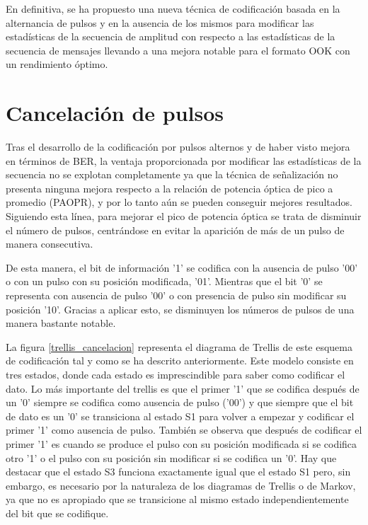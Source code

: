 En definitiva, se ha propuesto una nueva técnica de codificación basada en la 
alternancia de pulsos y en la ausencia de los mismos para modificar las estadísticas de la
secuencia de amplitud con respecto a las estadísticas de la secuencia de mensajes llevando
a una mejora notable para el formato OOK con un rendimiento óptimo.

\section{Cancelación de pulsos}

Tras el desarrollo de la codificación por pulsos alternos y de haber visto mejora en 
términos de BER, la ventaja proporcionada por modificar las estadísticas de la secuencia
no se explotan completamente ya que la técnica de señalización no presenta ninguna mejora
respecto a la relación de potencia óptica de pico a promedio (PAOPR), y por lo tanto aún
se pueden conseguir mejores resultados. Siguiendo esta línea, para mejorar el pico de 
potencia óptica se trata de disminuir el número de pulsos, centrándose en evitar la 
aparición de más de un pulso de manera consecutiva. 

De esta manera, el bit de información '1' se codifica con la ausencia de pulso '00' 
o con un pulso con su posición modificada, '01'. Mientras que el bit '0' se representa con
ausencia de pulso '00' o con presencia de pulso sin modificar su posición '10'. Gracias
a aplicar esto, se disminuyen los números de pulsos de una manera bastante notable. 

La figura \ref{trellis_cancelacion} representa el diagrama de Trellis de este esquema
de codificación tal y como se ha descrito anteriormente. Este modelo consiste en tres 
estados, donde cada estado es imprescindible para saber como codificar el dato.
Lo más importante del trellis es que el primer '1' que se codifica después de un '0'
siempre se codifica como ausencia de pulso ('00') y que siempre que el bit de dato
es un '0' se transiciona al estado S1 para volver a empezar y codificar el primer '1'
como ausencia de pulso. También se observa que después de codificar el primer '1' es 
cuando se produce el pulso con su posición modificada si se codifica otro '1' o el 
pulso con su posición sin modificar si se codifica un '0'.
Hay que destacar que el estado S3 funciona exactamente igual que el estado S1 pero,
sin embargo, es necesario por la naturaleza de los diagramas de Trellis o de Markov, 
ya que no es apropiado que se transicione al mismo estado independientemente del bit 
que se codifique.
\vspace{1cm}

